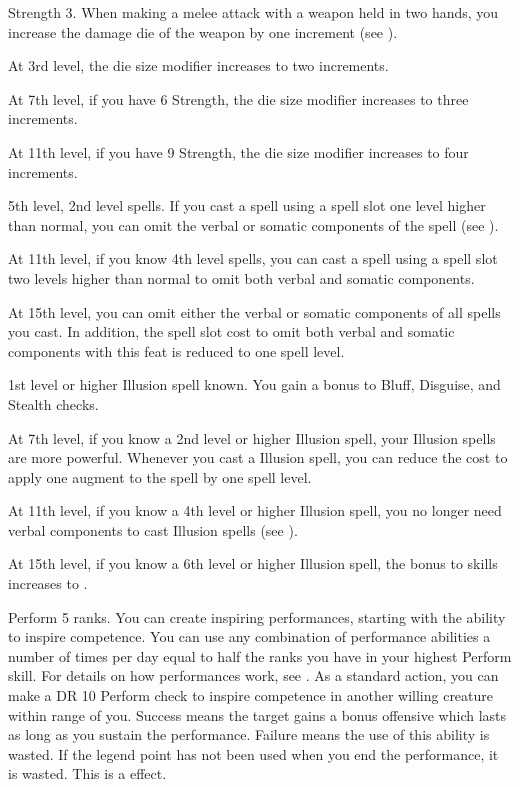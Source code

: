     \featpre Strength 3.
    \featben When making a melee attack with a weapon held in two hands, you increase the damage die of the weapon by one increment (see ).

    At 3rd level, the die size modifier increases to two increments.

    At 7th level, if you have 6 Strength, the die size modifier increases to three increments.

    At 11th level, if you have 9 Strength, the die size modifier increases to four increments.

    \featpre 5th level, 2nd level spells.
    \featben If you cast a spell using a spell slot one level higher than normal, you can omit the verbal or somatic components of the spell (see ).

    At 11th level, if you know 4th level spells, you can cast a spell using a spell slot two levels higher than normal to omit both verbal and somatic components.

    At 15th level, you can omit either the verbal or somatic components of all spells you cast.
    In addition, the spell slot cost to omit both verbal and somatic components with this feat is reduced to one spell level.

    \featpre 1st level or higher Illusion spell known.
    \featben You gain a  bonus to Bluff, Disguise, and Stealth checks.

    At 7th level, if you know a 2nd level or higher Illusion spell, your Illusion spells are more powerful.
    Whenever you cast a Illusion spell, you can reduce the cost to apply one augment to the spell by one spell level.

    At 11th level, if you know a 4th level or higher Illusion spell, you no longer need verbal components to cast Illusion spells (see ).

    At 15th level, if you know a 6th level or higher Illusion spell, the bonus to skills increases to .

    \featpre Perform 5 ranks.
    \featben You can create inspiring performances, starting with the ability to inspire competence.
    You can use any combination of performance abilities a number of times per day equal to half the ranks you have in your highest Perform skill.
    For details on how performances work, see .
    As a standard action, you can make a DR 10 Perform check to inspire competence in another willing creature within \rngmed range of you.
    Success means the target gains a bonus offensive  which lasts as long as you sustain the performance.
    Failure means the use of this ability is wasted.
    If the legend point has not been used when you end the performance, it is wasted.
    This is a  effect.


